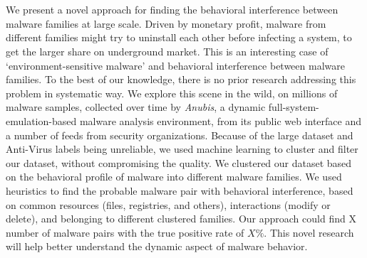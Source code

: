 \chapter{\abstractname}
We present a novel approach for finding the behavioral interference between malware families at large scale.
Driven by monetary profit, malware from different families might try to uninstall each other before infecting a system, to get the larger share on underground market.
This is an interesting case of `environment-sensitive malware' and behavioral interference between malware families.
To the best of our knowledge, there is no prior research addressing this problem in systematic way.
We explore this scene in the wild, on millions of malware samples, collected over time by \emph{Anubis}, a dynamic full-system-emulation-based malware analysis environment, from its public web interface and a number of feeds from security organizations.
Because of the large dataset and Anti-Virus labels being unreliable, we used machine learning to cluster and filter our dataset, without compromising the quality.
We clustered our dataset based on the behavioral profile of malware into different malware families.
We used heuristics to find the probable malware pair with behavioral interference, based on common resources (files, registries, and others), interactions (modify or delete), and belonging to different clustered families.
Our approach could find X number of malware pairs with the true positive rate of $X\%$.
This novel research will help better understand the dynamic aspect of malware behavior.

